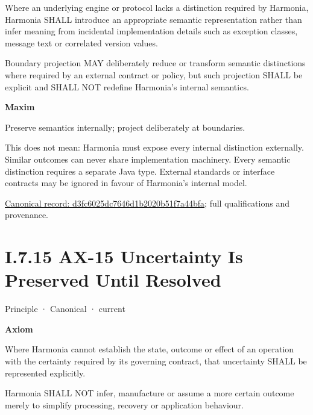 Where an underlying engine or protocol lacks a distinction required by Harmonia, Harmonia SHALL introduce an appropriate semantic representation rather than infer meaning from incidental implementation details such as exception classes, message text or correlated version values.



Boundary projection MAY deliberately reduce or transform semantic distinctions where required by an external contract or policy, but such projection SHALL be explicit and SHALL NOT redefine Harmonia's internal semantics.



\par\medskip\textbf{Maxim}\par


Preserve semantics internally; project deliberately at boundaries.



This does not mean: Harmonia must expose every internal distinction externally. Similar outcomes can never share implementation machinery. Every semantic distinction requires a separate Java type. External standards or interface contracts may be ignored in favour of Harmonia's internal model.


{\footnotesize \href{../../../../continuum/motivation/principle/d3fc6025dc7646d1b2020b51f7a44bfa.md}{Canonical record: d3fc6025dc7646d1b2020b51f7a44bfa}; full qualifications and provenance.}\par
\section*{I.7.15 AX-15 Uncertainty Is Preserved Until Resolved}
\label{navigation:I.7.15}

\label{element:ef8abbaec37e4890ad78b9f263e67906}
{\small Principle · Canonical · current}\par

\par\medskip\textbf{Axiom}\par


Where Harmonia cannot establish the state, outcome or effect of an operation with the certainty required by its governing contract, that uncertainty SHALL be represented explicitly.



Harmonia SHALL NOT infer, manufacture or assume a more certain outcome merely to simplify processing, recovery or application behaviour.



